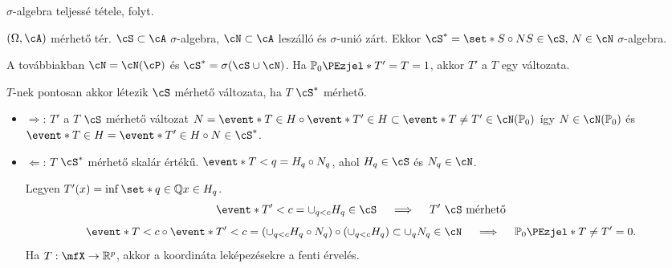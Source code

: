 \documentclass[aspectratio=169,notheorems,9pt,\option]{beamer}
\begin{document}
\begin{frame}{$\sigma$-algebra teljessé tétele, folyt.}
  \begin{proposition}
    $(\Omega,\cA)$ mérhető tér. $\cS\subset\cA$ $\sigma$-algebra, 
    $\cN\subset\cA$ leszálló és $\sigma$-unió zárt. Ekkor
    $\cS^*=\set*{S\circ N}{S\in\cS,\,N\in\cN}$ $\sigma$-algebra.
  \end{proposition}
  
  A továbbiakban $\cN=\cN(\cP)$ és $\cS^*=\sigma(\cS\cup\cN)$.
  Ha $\P[0]{T'=T}=1$, akkor %
  $T'$ a $T$ egy változata.
  \begin{proposition}
    $T$-nek pontosan akkor létezik $\cS$ mérhető változata, ha $T$ $\cS^*$ mérhető.
  \end{proposition}
  \begin{itemize}
    \item $\Rightarrow$: $T'$  a $T$ $\cS$ mérhető változat 
    $N=\event*{T\in H}\circ\event*{T'\in H}\subset \event*{T\neq T'}\in\cN(\P[0])$ 
    így $N\in\cN(\P[0])$ 
    és $\event*{T\in H}=\event*{T'\in H}\circ N\in \cS^*$. 
    \item $\Leftarrow$: $T$ $\cS^*$ mérhető skalár értékű. $\event*{T<q}=H_q\circ N_q$, 
    ahol $H_q\in\cS$ és $N_q\in\cN$.

    \pause
    Legyen $T'(x)=\inf\set*{q\in\Q}{x\in H_q}$.
    \pause
    \begin{displaymath}
      \event*{T'<c}=\cup_{q<c} H_q\in\cS\quad\implies\quad \text{$T'$ $\cS$ mérhető}
    \end{displaymath} 
    \pause
    \begin{displaymath}
      \event*{T<c}\circ\event*{T'<c}=(\cup_{q<c}H_q\circ N_q)\circ(\cup_{q<c}H_q)
      \subset\cup_q N_q\in\cN \quad\implies\quad\P[0]{T\neq T'}=0.
    \end{displaymath}
    \pause
    Ha $T:\mfX\to\real^p$, akkor a koordináta leképezésekre a fenti érvelés.
  \end{itemize}  
\end{frame}

  
\end{document}
